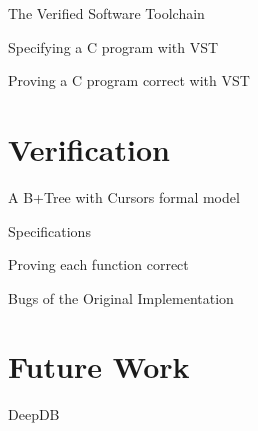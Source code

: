 \documentclass[page number]{beamer}
\begin{document}
\begin{frame}{The Verified Software Toolchain}

  
\end{frame}

\begin{frame}{Specifying a C program with VST}


\end{frame}

\begin{frame}{Proving a C program correct with VST}

  
\end{frame}

\section{Verification}
\begin{frame}{A B+Tree with Cursors formal model}

  
\end{frame}

\begin{frame}{Specifications}

\end{frame}

\begin{frame}{Proving each function correct}


\end{frame}

\begin{frame}{Bugs of the Original Implementation}
  
\end{frame}

\section{Future Work}
\begin{frame}{DeepDB}

\end{frame}
  
\end{document}
